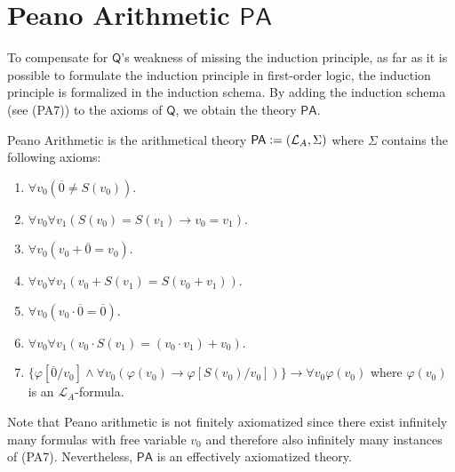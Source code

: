 \section{Peano Arithmetic $\mathsf{PA}$}
To compensate for $\mathsf{Q}$'s weakness of missing the induction principle, as far as it is possible to formulate the induction principle in first-order logic, the induction principle is formalized in the induction schema. By adding the induction schema (see (PA7)) to the axioms of $\mathsf{Q}$, we obtain the theory $\mathsf{PA}$.
\begin{dfn}
Peano Arithmetic is the arithmetical theory $\mathsf{PA} \vcentcolon= (\mathcal{L}_A,\Sigma)$ where $\Sigma$ contains the following axioms:
\begin{enumerate}[label=({PA\arabic*})]
\item $\forall v_0 (\overline{0} \neq S (v_0))$.
\item $\forall v_0 \forall v_1  ( S(v_0) = S(v_1) \rightarrow v_0 = v_1)$.
\item $\forall v_0  ( v_0 + \overline{0} = v_0)$.
\item $\forall v_0 \forall v_1 (v_0 + S(v_1) = S(v_0+v_1))$.
\item $\forall v_0 ( v_0 \cdot \overline{0} = \overline{0})$.
\item $\forall v_0 \forall v_1 ( v_0 \cdot S (v_1) = (v_0 \cdot v_1 ) + v_0) $.
\item $ \lbrace \varphi[\overline{0}/v_0] \wedge \forall v_0  ( \varphi(v_0) \rightarrow \varphi [ S(v_0)/v_0]) \rbrace \rightarrow \forall v_0 \varphi
(v_0) $ where $\varphi(v_0)$ is an $\mathcal{L}_A$-formula.
\end{enumerate}
\end{dfn} 

Note that Peano arithmetic is not finitely axiomatized since there exist infinitely many formulas with free variable $v_0$ and therefore also infinitely many instances of (PA7). Nevertheless, $\mathsf{PA}$ is an effectively axiomatized theory.


